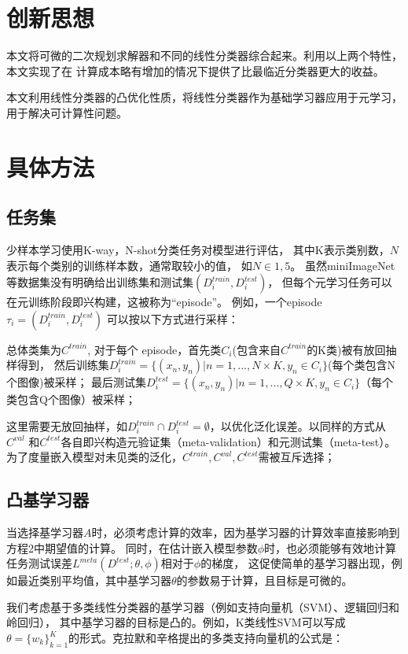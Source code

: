 \section{创新思想}
本文将可微的二次规划求解器和不同的线性分类器综合起来。利用以上两个特性，本文实现了在
计算成本略有增加的情况下提供了比最临近分类器更大的收益。

本文利用线性分类器的凸优化性质，将线性分类器作为基础学习器应用于元学习，用于解决可计算性问题。


\section{具体方法}
\subsection{任务集}
少样本学习使用K-way，N-shot分类任务对模型进行评估，
其中K表示类别数，$N$表示每个类别的训练样本数，通常取较小的值，
如$N\in{1,5}$。
虽然miniImageNet等数据集没有明确给出训练集和测试集$(D_i^{train}, D_i^{test})$，
但每个元学习任务可以在元训练阶段即兴构建，这被称为“episode”。
例如，一个episode $\tau_i=(D_i^{train}, D_i^{test})$ 可以按以下方式进行采样：

总体类集为$C^{train}$, 对于每个 episode，首先类$C_i$(包含来自$C^{train}$的K类)被有放回抽样得到，
然后训练集$D_i^{train} = \{(x_n, y_n) | n=1,...,N \times K, y_n \in C_i\}$(每个类包含N个图像)被采样；
最后测试集$D_i^{test} = \{(x_n, y_n) | n = 1,...,Q \times K, y_n \in C_i\}$（每个类包含Q个图像）被采样；

这里需要无放回抽样，如$D_i^{train} \cap D_i^{test} = \emptyset $，以优化泛化误差。以同样的方式从$C^{val}$
和$C^{test}$各自即兴构造元验证集（meta-validation）和元测试集（meta-test）。
为了度量嵌入模型对未见类的泛化，$C^{train}, C^{val}, C^{test}$需被互斥选择；

\subsection{凸基学习器}

当选择基学习器$A$时，必须考虑计算的效率，因为基学习器的计算效率直接影响到方程2中期望值的计算。
同时，在估计嵌入模型参数$\phi$时，也必须能够有效地计算任务测试误差$L^{meta}(D^{test}; \theta,\phi)$相对于$\phi$的梯度，
这促使简单的基学习器出现，例如最近类别平均值，其中基学习器$\theta$的参数易于计算，且目标是可微的。

我们考虑基于多类线性分类器的基学习器（例如支持向量机（SVM）、逻辑回归和岭回归），
其中基学习器的目标是凸的。例如，K类线性SVM可以写成$\theta = \{w_k\}^K_{k=1}$的形式。克拉默和辛格提出的多类支持向量机的公式是：

